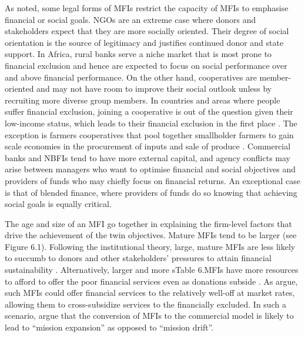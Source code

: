 \documentclass[a4paper, nobind]{templates/ociamthesis}
\begin{document}
As noted, some legal forms of MFIs restrict the capacity of MFIs to emphasise financial or social goals. NGOs are an extreme case where donors and stakeholders expect that they are more socially oriented. Their degree of social orientation is the source of legitimacy and justifies continued donor and state support. In Africa, rural banks serve a niche market that is most prone to financial exclusion and hence are expected to focus on social performance over and above financial performance. On the other hand, cooperatives are member-oriented and may not have room to improve their social outlook unless by recruiting more diverse group members. In countries and areas where people suffer financial exclusion, joining a cooperative is out of the question given their low-income status, which leads to their financial exclusion in the first place \autocite{demirguc2018global}. The exception is farmers cooperatives that pool together smallholder farmers to gain scale economies in the procurement of inputs and sale of produce \autocite{porter1987economic}. Commercial banks and NBFIs tend to have more external capital, and agency conflicts may arise between managers who want to optimise financial and social objectives and providers of funds who may chiefly focus on financial returns. An exceptional case is that of blended finance, where providers of funds do so knowing that achieving social goals is equally critical.

The age and size of an MFI go together in explaining the firm-level factors that drive the achievement of the twin objectives. Mature MFIs tend to be larger (see Figure 6.1). Following the institutional theory, large, mature MFIs are less likely to succumb to donors and other stakeholders' pressures to attain financial sustainability \autocite{d2017aid}. Alternatively, larger and more sTable 6.MFIs have more resources to afford to offer the poor financial services even as donations subside \autocite{d2013unsubsidized}. As \textcite{mersland2010microfinance} argue, such MFIs could offer financial services to the relatively well-off at market rates, allowing them to cross-subsidize services to the financially excluded. In such a scenario, \textcite{mersland2010microfinance} argue that the conversion of MFIs to the commercial model is likely to lead to ``mission expansion'' as opposed to ``mission drift''.
\end{document}
